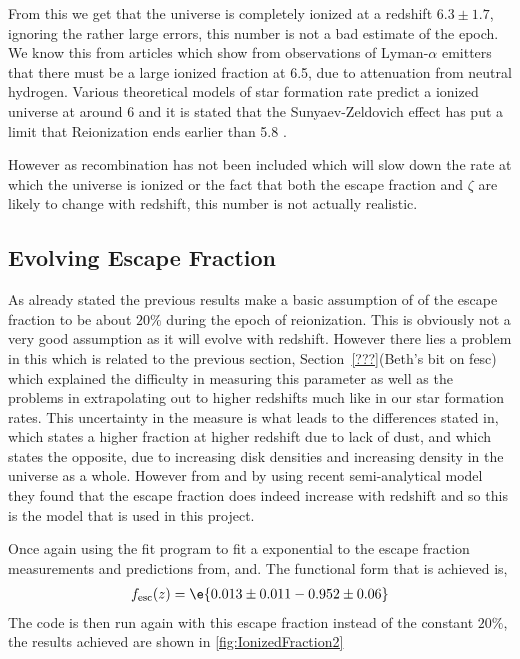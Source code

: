 	From this we get that the universe is completely ionized at a redshift $6.3\pm1.7$, ignoring the rather large errors, this number is not a bad estimate of the epoch. We know this from articles which show from observations of Lyman-$\alpha$ emitters that there must be a large ionized fraction at 6.5, due to attenuation from neutral hydrogen\cite{Ota:arXiv0707.1561}. Various theoretical models of star formation rate predict a ionized universe at around 6 and it is stated that the Sunyaev-Zeldovich effect has put a limit that Reionization ends earlier than 5.8 \cite{2012MNRAS.423..862K}.

	However as recombination has not been included which will slow down the rate at which the universe is ionized or the fact that both the escape fraction and $\zeta$ are likely to change with redshift, this number is not actually realistic.

	\subsection{Evolving Escape Fraction} %
	\label{sub:evolving_escape_fraction}
		As already stated the previous results make a basic assumption of of the escape fraction to be about $20\%$ during the epoch of reionization. This is obviously not a very good assumption as it will evolve with redshift. However there lies a problem in this which is related to the previous section, Section~\ref{???}(Beth's bit on fesc) which explained the difficulty in measuring this parameter as well as the problems in extrapolating out to higher redshifts much like in our star formation rates. This uncertainty in the measure is what leads to the differences stated in\cite{2012ApJ...759L..38A}, which states a higher fraction at higher redshift due to lack of dust, and\cite{2000ApJ...545...86W} which states the opposite, due to increasing disk densities and increasing density in the universe as a whole. However from\cite{2012arXiv1209.2123F} and\cite{2013MNRAS.428L...1M} by using recent semi-analytical model they found that the escape fraction does indeed increase with redshift and so this is the model that is used in this project.

		Once again using the fit program to fit a exponential to the escape fraction measurements and predictions from\cite{2012ApJ...759L..38A},\cite{2006ApJ...651L..89R} and\cite{2006MNRAS.371L...1I}. The functional form that is achieved is,
		\begin{align}
			f_\text{esc}(z)=\e{0.013\pm0.011-0.952\pm0.06}
		\end{align}
		The code is then run again with this escape fraction instead of the constant $20\%$, the results achieved are shown in \ref{fig:IonizedFraction2}


